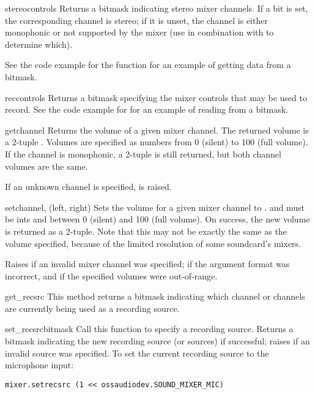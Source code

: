 \begin{methoddesc}{stereocontrols}{}
Returns a bitmask indicating stereo mixer channels.  If a bit is set,
the corresponding channel is stereo; if it is unset, the channel is
either monophonic or not supported by the mixer (use in combination with
 to determine which).

See the code example for the  function for an example
of getting data from a bitmask.
\end{methoddesc}

\begin{methoddesc}{reccontrols}{}
Returns a bitmask specifying the mixer controls that may be used to
record.  See the code example for  for an example of
reading from a bitmask.
\end{methoddesc}

\begin{methoddesc}{get}{channel}
Returns the volume of a given mixer channel.  The returned volume is a
2-tuple .  Volumes are specified as
numbers from 0 (silent) to 100 (full volume).  If the channel is
monophonic, a 2-tuple is still returned, but both channel volumes are
the same.

If an unknown channel is specified,  is raised.
\end{methoddesc}

\begin{methoddesc}{set}{channel, (left, right)}
Sets the volume for a given mixer channel to .
 and  must be ints and between 0 (silent) and 100
(full volume).  On success, the new volume is returned as a 2-tuple.
Note that this may not be exactly the same as the volume specified,
because of the limited resolution of some soundcard's mixers.

Raises  if an invalid mixer channel was specified;
 if the argument format was incorrect, and
 if the specified volumes were out-of-range.
\end{methoddesc}

\begin{methoddesc}{get_recsrc}{}
This method returns a bitmask indicating which channel or channels are
currently being used as a recording source.
\end{methoddesc}

\begin{methoddesc}{set_recsrc}{bitmask}
Call this function to specify a recording source.  Returns a bitmask
indicating the new recording source (or sources) if successful; raises
 if an invalid source was specified.  To set the current
recording source to the microphone input:

\begin{verbatim}
mixer.setrecsrc (1 << ossaudiodev.SOUND_MIXER_MIC)
\end{verbatim}
\end{methoddesc}



